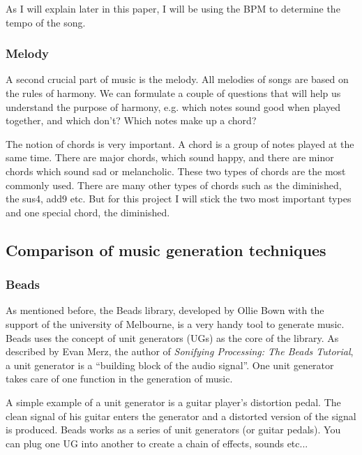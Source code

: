 \documentclass[12pt]{article}
\begin{document}
As I will explain later in this paper, I will be using the BPM to determine the tempo of the song.

\subsubsection{Melody}

A second crucial part of music is the melody. All melodies of songs are based on the rules of harmony. We can formulate a couple of questions that will help us understand the purpose of harmony, e.g. which notes sound good when played together, and which don't? Which notes make up a chord?
\newline

The notion of chords is very important. A chord is a group of notes played at the same time.
There are major chords, which sound happy, and there are minor chords which sound sad or melancholic. These two types of chords are the most commonly used. There are many other types of chords such as the diminished, the sus4, add9 etc. But for this project I will stick the two most important types and one special chord, the diminished.

\subsection{Comparison of music generation techniques}

\subsubsection{Beads}
As mentioned before, the Beads library, developed by Ollie Bown with the support of the university of Melbourne, is a very handy tool to generate music. Beads uses the concept of unit generators (UGs) as the core of the library. As described by Evan Merz, the author of \textit{Sonifying Processing: The Beads Tutorial}, a unit generator is a ``building block of the audio signal''.  One unit generator takes care of one function in the generation of music. 
\newline

A simple example of a unit generator is a guitar player's distortion pedal. The clean signal of his guitar enters the generator and a distorted version of the signal is produced. Beads works as a series of unit generators (or guitar pedals). You can plug one UG into another to create a chain of effects, sounds etc... 
\newline
\end{document}
